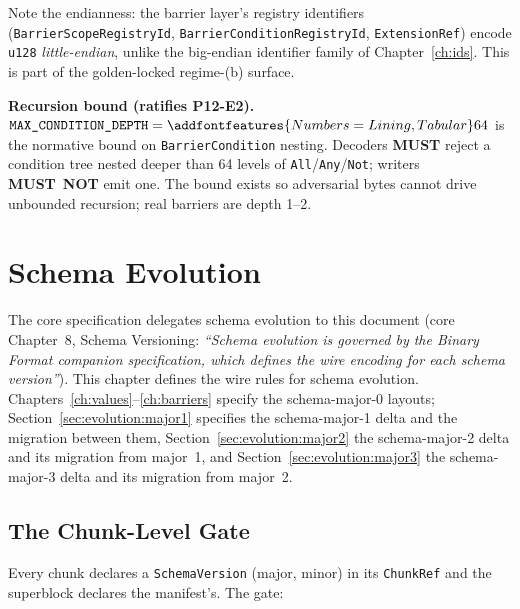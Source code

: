 \documentclass[11pt,letterpaper]{report}
\newcommand{\tablenums}[1]{{\addfontfeatures{Numbers={Lining,Tabular}}#1}}
\newcommand{\sectionsc}[1]{{\addfontfeatures{Letters=SmallCaps}#1}}
\newcounter{requirement}[chapter]
\newcommand{\MUST}{\textbf{MUST}}
\newcommand{\MUSTNOT}{\textbf{MUST}\nobreak\ \textbf{NOT}}
\begin{document}
Note the endianness: the barrier layer's registry identifiers
(\texttt{BarrierScopeRegistryId}, \texttt{BarrierConditionRegistryId},
\texttt{ExtensionRef}) encode \texttt{u128} \emph{little-endian}, unlike the
big-endian identifier family of Chapter~\ref{ch:ids}. This is part of the
golden-locked regime-(b) surface.

\begin{requirement}
\label{req:binfmt:condition-depth}
\textbf{Recursion bound (ratifies P12-E2).}
$\texttt{MAX\_CONDITION\_DEPTH} = \tablenums{64}$ is the normative bound on
\texttt{BarrierCondition} nesting. Decoders \MUST{} reject a condition tree
nested deeper than 64 levels of \texttt{All}/\texttt{Any}/\texttt{Not};
writers \MUSTNOT{} emit one. The bound exists so adversarial bytes cannot
drive unbounded recursion; real barriers are depth 1--2.
\end{requirement}

\chapter{Schema Evolution}
\label{ch:evolution}

The core specification delegates schema evolution to this document (core
Chapter~8, \sectionsc{Schema Versioning}: \emph{``Schema evolution is
governed by the Binary Format companion specification, which defines the
wire encoding for each schema version''}). This chapter defines the wire
rules for schema evolution. Chapters~\ref{ch:values}--\ref{ch:barriers}
specify the schema-major-0 layouts; Section~\ref{sec:evolution:major1}
specifies the schema-major-1 delta and the migration between them,
Section~\ref{sec:evolution:major2} the schema-major-2 delta and its
migration from major~1, and Section~\ref{sec:evolution:major3} the
schema-major-3 delta and its migration from major~2.

\section{The Chunk-Level Gate}
\label{sec:evolution:gate}

Every chunk declares a \texttt{SchemaVersion} (major, minor) in its
\texttt{ChunkRef} and the superblock declares the manifest's. The gate:
\end{document}
